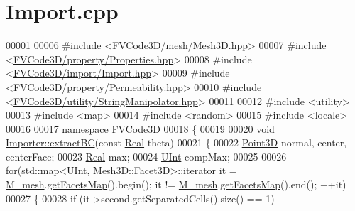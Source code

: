 \hypertarget{Import_8cpp_source}{}\section{Import.\+cpp}
\label{Import_8cpp_source}

\begin{DoxyCode}
00001 
00006 \textcolor{preprocessor}{#include <\hyperlink{Mesh3D_8hpp}{FVCode3D/mesh/Mesh3D.hpp}>}
00007 \textcolor{preprocessor}{#include <\hyperlink{Properties_8hpp}{FVCode3D/property/Properties.hpp}>}
00008 \textcolor{preprocessor}{#include <\hyperlink{Import_8hpp}{FVCode3D/import/Import.hpp}>}
00009 \textcolor{preprocessor}{#include <\hyperlink{Permeability_8hpp}{FVCode3D/property/Permeability.hpp}>}
00010 \textcolor{preprocessor}{#include <\hyperlink{StringManipolator_8hpp}{FVCode3D/utility/StringManipolator.hpp}>}
00011 
00012 \textcolor{preprocessor}{#include <utility>}
00013 \textcolor{preprocessor}{#include <map>}
00014 \textcolor{preprocessor}{#include <random>}
00015 \textcolor{preprocessor}{#include <locale>}
00016 
00017 \textcolor{keyword}{namespace }\hyperlink{namespaceFVCode3D}{FVCode3D}
00018 \{
00019 
\hypertarget{Import_8cpp_source.tex_l00020}{}\hyperlink{classFVCode3D_1_1Importer_a1cba26ff3b2c475a51866361883c59fc}{00020} \textcolor{keywordtype}{void} \hyperlink{classFVCode3D_1_1Importer_a1cba26ff3b2c475a51866361883c59fc}{Importer::extractBC}(\textcolor{keyword}{const} \hyperlink{namespaceFVCode3D_a40c1f5588a248569d80aa5f867080e83}{Real} theta)
00021 \{
00022     \hyperlink{classFVCode3D_1_1Point3D}{Point3D} normal, center, centerFace;
00023     \hyperlink{namespaceFVCode3D_a40c1f5588a248569d80aa5f867080e83}{Real} max;
00024     \hyperlink{namespaceFVCode3D_a4bf7e328c75d0fd504050d040ebe9eda}{UInt} compMax;
00025 
00026     \textcolor{keywordflow}{for}(std::map<UInt, Mesh3D::Facet3D>::iterator it = \hyperlink{classFVCode3D_1_1Importer_a6f1542d6c6ac192e36c8eec7dc366653}{M\_mesh}.\hyperlink{classFVCode3D_1_1Mesh3D_a76de387da2a552e3e1210d795bc7acf9}{getFacetsMap}().begin(); it 
      != \hyperlink{classFVCode3D_1_1Importer_a6f1542d6c6ac192e36c8eec7dc366653}{M\_mesh}.\hyperlink{classFVCode3D_1_1Mesh3D_a76de387da2a552e3e1210d795bc7acf9}{getFacetsMap}().end(); ++it)
00027     \{
00028         \textcolor{keywordflow}{if} (it->second.getSeparatedCells().size() == 1)

\end{DoxyCode}

